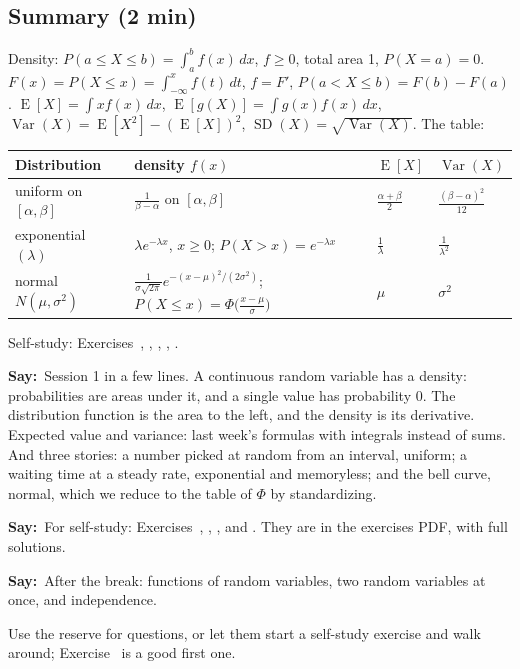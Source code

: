 \documentclass[11pt,a4paper,parskip=half]{scrartcl}
\renewcommand{\needspace}[1]{\Needspace{6\baselineskip}}
\newcommand{\E}{\operatorname{E}}
\newcommand{\Var}{\operatorname{Var}}
\newcommand{\SD}{\operatorname{SD}}
\newcommand{\say}{\textbf{\color{teal}Say:}\ }
\begin{document}
\needspace{0.25\textheight}
\begin{printskip}
	\subsection{Summary (2 min)}

	\needspace{0.22\textheight}
	\begin{onslide}
		Density: $P(a\le X\le b)=\int_a^b f(x)\,dx$, $f\ge0$, total area 1,
		$P(X=a)=0$. $F(x)=P(X\le x)=\int_{-\infty}^x f(t)\,dt$, $f=F'$,
		$P(a<X\le b)=F(b)-F(a)$. $\E[X]=\int x f(x)\,dx$,
		$\E[g(X)]=\int g(x)f(x)\,dx$, $\Var(X)=\E[X^2]-(\E[X])^2$,
		$\SD(X)=\sqrt{\Var(X)}$. The table:
		\begin{center}
			\renewcommand{\arraystretch}{1.25}
			\begin{tabular}{@{}llll@{}}
				\toprule
				Distribution & density $f(x)$ & $\E[X]$ & $\Var(X)$\\\midrule
				uniform on $[\alpha,\beta]$ & $\frac{1}{\beta-\alpha}$ on
				$[\alpha,\beta]$ & $\frac{\alpha+\beta}{2}$ &
				$\frac{(\beta-\alpha)^2}{12}$\\
				exponential $(\lambda)$ & $\lambda e^{-\lambda x}$, $x\ge0$;
				$P(X>x)=e^{-\lambda x}$ & $\frac1\lambda$ & $\frac1{\lambda^2}$\\
				normal $N(\mu,\sigma^2)$ & $\frac{1}{\sigma\sqrt{2\pi}}
				e^{-(x-\mu)^2/(2\sigma^2)}$; $P(X\le x)=\Phi\big(\frac{x-\mu}{\sigma}\big)$
				& $\mu$ & $\sigma^2$\\\bottomrule
			\end{tabular}
		\end{center}
		Self-study: Exercises~,
		, ,
		, .
	\end{onslide}

	\say Session 1 in a few lines. A continuous random variable has a
	density: probabilities are areas under it, and a single value has
	probability 0. The distribution function is the area to the left, and
	the density is its derivative. Expected value and variance: last week's
	formulas with integrals instead of sums. And three stories: a number
	picked at random from an interval, uniform; a waiting time at a steady
	rate, exponential and memoryless; and the bell curve, normal, which we
	reduce to the table of $\Phi$ by standardizing.

	\say For self-study: Exercises~,
	, ,
	 and . They are in the
	exercises PDF, with full solutions.

	\say After the break: functions of random variables, two random
	variables at once, and independence.

	\begin{cue}
		Use the reserve for questions, or let them start a self-study exercise
		and walk around; Exercise~ is a good
		first one.
	\end{cue}
\end{printskip}
\end{document}
